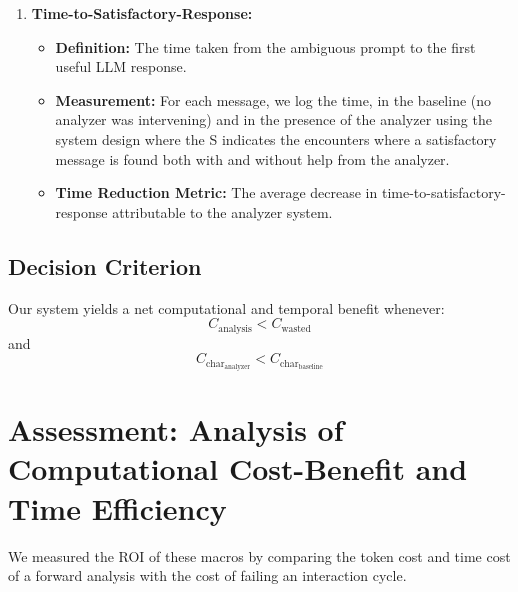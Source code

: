 \documentclass[conference]{IEEEtran}
\begin{document}
\begin{enumerate}
    \item \textbf{Time-to-Satisfactory-Response:}
    \begin{itemize}
        \item \textbf{Definition:}
        The time taken from the ambiguous prompt to the first useful LLM response.
        \item \textbf{Measurement:}
        For each message, we log the time, in the baseline (no analyzer was intervening) and in the presence of the analyzer using the system design where the S indicates the encounters where a satisfactory message is found both with and without help from the analyzer.
        \item \textbf{Time Reduction Metric:}
        The average decrease in time-to-satisfactory-response attributable to the analyzer system.  
    \end{itemize}
\end{enumerate}

\subsection{Decision Criterion}
Our system yields a net computational and temporal benefit whenever:
\begin{equation}
C_{\text{analysis}} < C_{\text{wasted}}
\end{equation}
and
\begin{equation}
C_{\text{char}_{\text{analyzer}}} < C_{\text{char}_{\text{baseline}}}
\end{equation}

\section{Assessment: Analysis of Computational Cost-Benefit and Time Efficiency}
We measured the ROI of these macros by comparing the token cost and time cost of a forward analysis with the cost of failing an interaction cycle.
\end{document}
